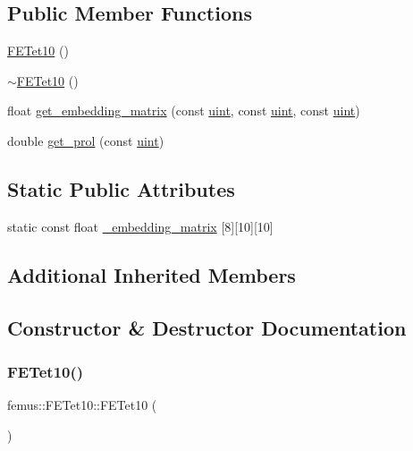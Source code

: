 \subsection*{Public Member Functions}
\begin{DoxyCompactItemize}
\item 
\mbox{\hyperlink{classfemus_1_1_f_e_tet10_a24cb1e539fdf5acebe8e5829154a27bf}{F\+E\+Tet10}} ()
\item 
\mbox{\hyperlink{classfemus_1_1_f_e_tet10_a0d4fe455092a4e1ede5fe3fac3cf31ec}{$\sim$\+F\+E\+Tet10}} ()
\item 
float \mbox{\hyperlink{classfemus_1_1_f_e_tet10_a5db8941e2d1acf599b6119405d1bc77a}{get\+\_\+embedding\+\_\+matrix}} (const \mbox{\hyperlink{_typedefs_8hpp_a91ad9478d81a7aaf2593e8d9c3d06a14}{uint}}, const \mbox{\hyperlink{_typedefs_8hpp_a91ad9478d81a7aaf2593e8d9c3d06a14}{uint}}, const \mbox{\hyperlink{_typedefs_8hpp_a91ad9478d81a7aaf2593e8d9c3d06a14}{uint}})
\item 
double \mbox{\hyperlink{classfemus_1_1_f_e_tet10_a7aa7d792698ab0e0e39bef7575642117}{get\+\_\+prol}} (const \mbox{\hyperlink{_typedefs_8hpp_a91ad9478d81a7aaf2593e8d9c3d06a14}{uint}})
\end{DoxyCompactItemize}
\subsection*{Static Public Attributes}
\begin{DoxyCompactItemize}
\item 
static const float \mbox{\hyperlink{classfemus_1_1_f_e_tet10_a94c06cc33b4084a614e2d7c0a624bc58}{\+\_\+embedding\+\_\+matrix}} \mbox{[}8\mbox{]}\mbox{[}10\mbox{]}\mbox{[}10\mbox{]}
\end{DoxyCompactItemize}
\subsection*{Additional Inherited Members}


\subsection{Constructor \& Destructor Documentation}
\mbox{\label{classfemus_1_1_f_e_tet10_a24cb1e539fdf5acebe8e5829154a27bf}} 
\subsubsection{\texorpdfstring{F\+E\+Tet10()}{FETet10()}}
{\footnotesize\ttfamily femus\+::\+F\+E\+Tet10\+::\+F\+E\+Tet10 (\begin{DoxyParamCaption}{ }\end{DoxyParamCaption})}

